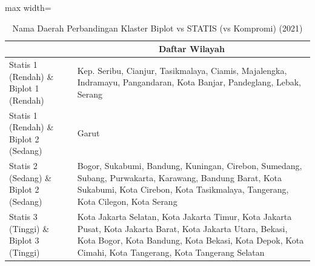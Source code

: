 \begin{table}[H]
\centering
\caption{Nama Daerah Perbandingan Klaster Biplot vs STATIS (vs Kompromi) (2021)} \label{tab:app2biplot_statis_name_2021}
\begin{adjustbox}{max width=\textwidth}
\begin{tabular}{|>{\centering\arraybackslash}p{4cm}|p{10cm}|}
\hline
\multicolumn{1}{|c|}{\textbf{Kategori}} & \multicolumn{1}{c|}{\textbf{Daftar Wilayah}} \\
\hline
Statis 1 (Rendah) \& Biplot 1 (Rendah) & Kep. Seribu, Cianjur, Tasikmalaya, Ciamis, Majalengka, Indramayu, Pangandaran, Kota Banjar, Pandeglang, Lebak, Serang \\
\hline
Statis 1 (Rendah) \& Biplot 2 (Sedang) & Garut \\
\hline
Statis 2 (Sedang) \& Biplot 2 (Sedang) & Bogor, Sukabumi, Bandung, Kuningan, Cirebon, Sumedang, Subang, Purwakarta, Karawang, Bandung Barat, Kota Sukabumi, Kota Cirebon, Kota Tasikmalaya, Tangerang, Kota Cilegon, Kota Serang \\
\hline
Statis 3 (Tinggi) \& Biplot 3 (Tinggi) & Kota Jakarta Selatan, Kota Jakarta Timur, Kota Jakarta Pusat, Kota Jakarta Barat, Kota Jakarta Utara, Bekasi, Kota Bogor, Kota Bandung, Kota Bekasi, Kota Depok, Kota Cimahi, Kota Tangerang, Kota Tangerang Selatan \\
\hline
\end{tabular}
\end{adjustbox}
\end{table}